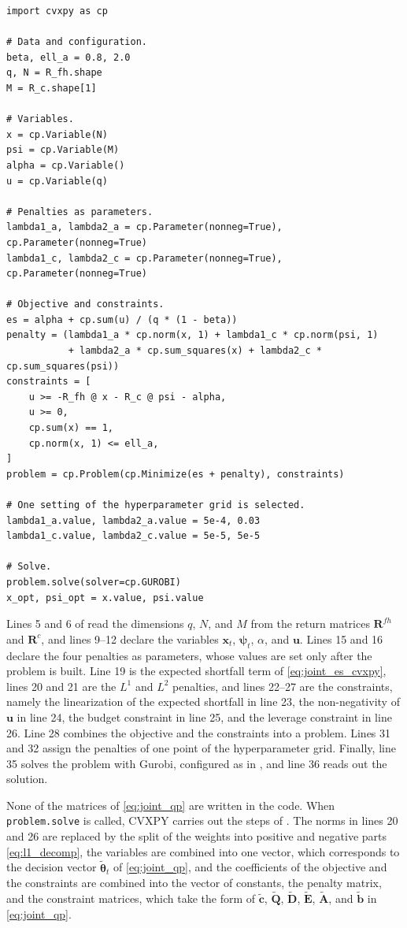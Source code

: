 \begin{lstlisting}[style=python, float=htbp, caption={Regularized joint expected shortfall program implementation in CVXPY.}, label={lst:joint-es}]
import cvxpy as cp

# Data and configuration.
beta, ell_a = 0.8, 2.0
q, N = R_fh.shape
M = R_c.shape[1]

# Variables.
x = cp.Variable(N)
psi = cp.Variable(M)
alpha = cp.Variable()
u = cp.Variable(q)

# Penalties as parameters.
lambda1_a, lambda2_a = cp.Parameter(nonneg=True), cp.Parameter(nonneg=True)
lambda1_c, lambda2_c = cp.Parameter(nonneg=True), cp.Parameter(nonneg=True)

# Objective and constraints.
es = alpha + cp.sum(u) / (q * (1 - beta))
penalty = (lambda1_a * cp.norm(x, 1) + lambda1_c * cp.norm(psi, 1)
           + lambda2_a * cp.sum_squares(x) + lambda2_c * cp.sum_squares(psi))
constraints = [
    u >= -R_fh @ x - R_c @ psi - alpha,
    u >= 0,
    cp.sum(x) == 1,
    cp.norm(x, 1) <= ell_a,
]
problem = cp.Problem(cp.Minimize(es + penalty), constraints)

# One setting of the hyperparameter grid is selected.
lambda1_a.value, lambda2_a.value = 5e-4, 0.03
lambda1_c.value, lambda2_c.value = 5e-5, 5e-5

# Solve.
problem.solve(solver=cp.GUROBI)
x_opt, psi_opt = x.value, psi.value
\end{lstlisting}

Lines 5 and 6 of  read the dimensions $q$, $N$, and $M$ from the return matrices $\bm{R}^{fh}$ and
$\bm{R}^c$, and lines 9--12 declare the variables $\bm{x}_t$, $\bm{\psi}_t$, $\alpha$, and $\bm{u}$. Lines 15 and 16 declare
the four penalties as parameters, whose values are set only after the problem is built. Line 19 is the expected shortfall term of
\eqref{eq:joint_es_cvxpy}, lines 20 and 21 are the $L^1$ and $L^2$ penalties, and lines 22--27 are the constraints, namely
the linearization of the expected shortfall in line 23, the non-negativity of $\bm{u}$ in line 24, the budget constraint in
line 25, and the leverage constraint in line 26. Line 28 combines the objective and the constraints into a problem. Lines
31 and 32 assign the penalties of one point of the hyperparameter grid. Finally, line 35 solves the problem with Gurobi, 
configured as in , and line 36 reads out the solution. 

None of the matrices of \eqref{eq:joint_qp} are written in the code. When \texttt{problem.solve} is called, CVXPY carries
out the steps of . The norms in lines 20 and 26 are replaced by the split of the weights into positive
and negative parts \eqref{eq:l1_decomp}, the variables are combined into one vector, which corresponds to the decision
vector $\tilde{\bm{\theta}}_t$ of \eqref{eq:joint_qp}, and the coefficients of the objective and the constraints are
combined into the vector of constants, the penalty matrix, and the constraint matrices, which take the form 
of $\tilde{\bm{c}}$, $\tilde{\bm{Q}}$, $\tilde{\bm{D}}$, $\tilde{\bm{E}}$, $\tilde{\bm{A}}$, and
$\tilde{\bm{b}}$ in \eqref{eq:joint_qp}. 

